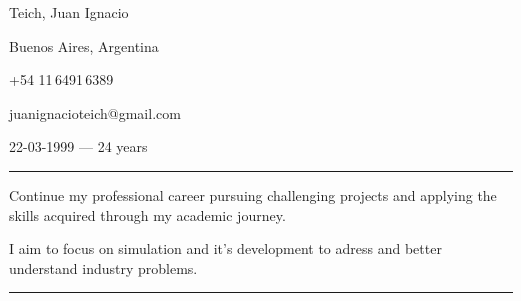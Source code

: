 \documentclass[a4paper,10pt]{article}
\newlength{\cvcolumngapwidth}
\newlength{\cvleftcolumnwidth}
\newlength{\cvrightcolumnwidth}
\newcommand{\cvnamestyle}[1]{{\Large\cvnamefont\textcolor{cvnamecolor}{#1}}}
\newcommand{\cvsectionstyle}[1]{{\normalsize\cvsectionfont\textcolor{cvsectioncolor}{#1}}}
\newcommand{\cvheadingstyle}[1]{{\normalsize\cvheadingfont\textcolor{cvheadingcolor}{#1}}}
\newlength{\cvafteritemskipamount}
\newlength{\cvaftersectionskipamount}
\newlength{\cvbetweensectionandheadingextraskipamount}
\newlength{\cvafternameskipamount}
\newlength{\cvafterpersonalinfolineskipamount}
\newlength{\cvparskip}
\newcommand{\cvpersonalinfo}[2]{
    \begin{minipage}[t]{\cvleftcolumnwidth}
        \vspace{0mm} %
        \raggedleft #1
    \end{minipage}%
    \hspace{\cvcolumngapwidth}%
    \begin{minipage}[t]{\cvrightcolumnwidth}
        \vspace{0mm} %
        #2
    \end{minipage}

    \vspace{\cvafteritemskipamount}
}
\newcommand{\cvname}[1]{
    \cvnamestyle{#1}

    \vspace{\cvafternameskipamount}
}
\newcommand{\cvpersonalinfolinewithicon}[3]{
    \raisebox{.5\fontcharht\font`E-.5\height}{\texttt{[image: \#2]}}
    #3

    \vspace{\cvafterpersonalinfolineskipamount}
}
\newcommand{\cvsection}[1]{
    \begin{minipage}[t]{\cvleftcolumnwidth}
        \raggedleft\cvsectionstyle{#1}
    \end{minipage}%
    \hspace{\cvcolumngapwidth}%
    \begin{minipage}[t]{\cvrightcolumnwidth}
        \textcolor{cvrulecolor}{\rule{\cvrightcolumnwidth}{0.3mm}}
    \end{minipage}

    \vspace{\cvaftersectionskipamount}
}
\newcommand{\cvitem}[2]{
    \begin{minipage}[t]{\cvleftcolumnwidth}
        \raggedleft #1
    \end{minipage}%
    \hspace{\cvcolumngapwidth}%
    \begin{minipage}[t]{\cvrightcolumnwidth}
        \setlength{\parskip}{\cvparskip} #2
    \end{minipage}

    \vspace{\cvafteritemskipamount}
}
\begin{document}

  \flushright
    \cvname{Teich, Juan Ignacio}

    \cvpersonalinfolinewithicon{height=4mm}{../logos-photos/072-location.pdf}{
       Buenos Aires, Argentina
    }

    \cvpersonalinfolinewithicon{height=4mm}{../logos-photos/067-phone.pdf}{
        +54 11\,6491\,6389
    }

    \cvpersonalinfolinewithicon{height=4mm}{../logos-photos/070-envelop.pdf}{
        juanignacioteich@gmail.com
    }


        22-03-1999  ---   24 years

\cvsection{PROFESSIONAL OBJECTIVES}

\vspace{\cvbetweensectionandheadingextraskipamount}
\cvitem{\cvheadingstyle{}}{
    Continue my professional career pursuing challenging projects and applying the skills acquired through my academic journey.

    I aim to focus on simulation and it's development to adress and better understand industry problems.
}



\cvsection{EDUCATION}
\end{document}
